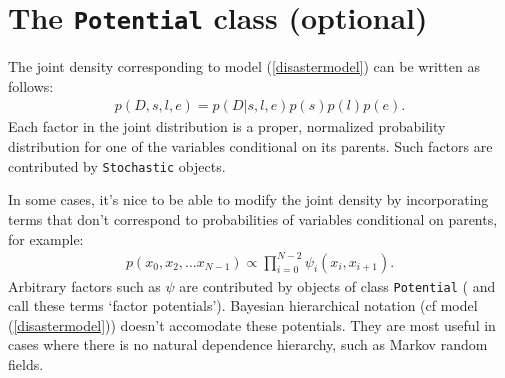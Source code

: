 \section{The \texttt{Potential} class (optional)}


The joint density corresponding to model (\ref{disastermodel}) can be written as follows:
\begin{eqnarray*}
    p(D,s,l,e) = p(D|s,l,e) p(s) p(l) p(e).
\end{eqnarray*}
Each factor in the joint distribution is a proper, normalized probability distribution for one of the variables conditional on its parents. Such factors are contributed by \texttt{Stochastic} objects.

In some cases, it's nice to be able to modify the joint density by incorporating terms that don't correspond to probabilities of variables conditional on parents, for example:
\begin{eqnarray*}
    p(x_0, x_2, \ldots x_{N-1}) \propto \prod_{i=0}^{N-2} \psi_i(x_i, x_{i+1}).
\end{eqnarray*}
Arbitrary factors such as $\psi$ are contributed by objects of class \texttt{Potential} (\cite{dawidmarkov} and \cite{jordangraphical} call these terms `factor potentials'). Bayesian hierarchical notation (cf model (\ref{disastermodel})) doesn't accomodate these potentials. They are most useful in cases where there is no natural dependence hierarchy, such as Markov random fields.

